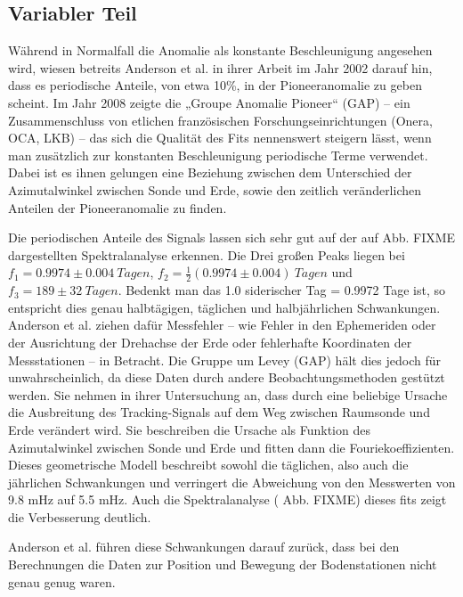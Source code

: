 
\subsection{Variabler Teil}
Während in Normalfall die Anomalie als konstante Beschleunigung angesehen wird, wiesen betreits Anderson et al. in
ihrer Arbeit im Jahr 2002 darauf hin, dass es periodische Anteile, von etwa 10\%, in der Pioneeranomalie zu
geben scheint.
Im Jahr 2008 zeigte die „Groupe Anomalie Pioneer“ (GAP) – ein Zusammenschluss von etlichen französischen Forschungseinrichtungen (Onera, OCA, LKB) –
das sich die Qualität des Fits nennenswert steigern lässt, wenn man zusätzlich zur konstanten Beschleunigung
periodische Terme verwendet.
Dabei ist es ihnen gelungen eine Beziehung zwischen dem Unterschied der Azimutalwinkel zwischen Sonde und Erde, sowie
den zeitlich veränderlichen Anteilen der Pioneeranomalie zu finden. %

Die periodischen Anteile des Signals lassen sich sehr gut auf der auf Abb. FIXME dargestellten Spektralanalyse
erkennen. Die Drei großen Peaks liegen bei $f_1=0.9974\pm0.004\ Tagen$, $f_2=\frac12(0.9974\pm0.004)\ Tagen$ und 
$f_3=189\pm32\ Tagen$. Bedenkt man das 1.0 siderischer Tag = 0.9972 Tage ist, so entspricht dies genau
halbtägigen, täglichen und halbjährlichen Schwankungen.
Anderson et al. ziehen dafür Messfehler – wie Fehler in den Ephemeriden oder der Ausrichtung der Drehachse der Erde
oder fehlerhafte Koordinaten der Messstationen – in Betracht. %
Die Gruppe um Levey (GAP) hält dies jedoch für unwahrscheinlich, da diese Daten durch andere Beobachtungsmethoden
gestützt werden. %
Sie nehmen in ihrer Untersuchung an, dass durch eine beliebige Ursache die Ausbreitung des Tracking-Signals auf dem Weg
zwischen Raumsonde und Erde verändert wird. Sie beschreiben die Ursache als Funktion des Azimutalwinkel zwischen Sonde und Erde und fitten
dann die Fouriekoeffizienten. Dieses geometrische Modell beschreibt sowohl die täglichen, also auch die jährlichen
Schwankungen und verringert die Abweichung von den Messwerten von 9.8 mHz auf 5.5 mHz. Auch die Spektralanalyse (
Abb. FIXME) dieses fits zeigt die Verbesserung deutlich.\cite{Levy2008} %

Anderson et al. führen diese Schwankungen darauf zurück, dass bei den Berechnungen die Daten zur Position und Bewegung
der Bodenstationen nicht genau genug waren.\cite{Dittus2006} %


